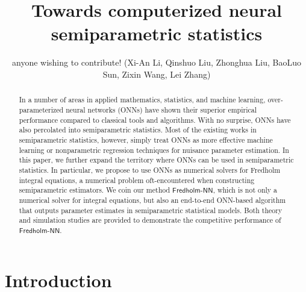 \documentclass[11pt]{article}
\makeatletter
\def\fred{\mathsf{Fredholm\mbox{-}NN}}
\def\thanks#1{\protected@xdef\@thanks{\@thanks
        \protect\footnotetext{#1}}}
\makeatother
\begin{document}
\title{Towards computerized neural semiparametric statistics}%
\author{anyone wishing to contribute! (Xi-An Li, Qinshuo Liu, Zhonghua Liu, BaoLuo Sun, Zixin Wang, Lei Zhang)}

\editor{}

\maketitle

\begin{abstract}
In a number of areas in applied mathematics, statistics, and machine learning, over-parameterized neural networks (ONNs) have shown their superior empirical performance compared to classical tools and algorithms. With no surprise, ONNs have also percolated into semiparametric statistics. Most of the existing works in semiparametric statistics, however, simply treat ONNs as more effective machine learning or nonparametric regression techniques for nuisance parameter estimation. In this paper, we further expand the territory where ONNs can be used in semiparametric statistics. In particular, we propose to use ONNs as numerical solvers for Fredholm integral equations, a numerical problem oft-encountered when constructing semiparametric estimators. We coin our method $\fred$, which is not only a numerical solver for integral equations, but also an end-to-end ONN-based algorithm that outputs parameter estimates in semiparametric statistical models. Both theory and simulation studies are provided to demonstrate the competitive performance of $\fred$.
\end{abstract}


\section{Introduction}
\label{sec:intro}
\end{document}
